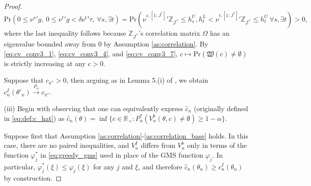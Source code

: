 \documentclass[letterpaper,11pt]{article}
\theoremstyle{myplain}
\theoremstyle{mydefinition}
\theoremstyle{myremark}
\renewcommand{\cite}{\citet}
\newcommand{\HH}{\mathbb{Z}}
\newcommand{\R}{\mathbb{R}}
\numberwithin{equation}{section}
\numberwithin{figure}{section}
\begin{document}
\begin{appendices}
\begin{proof}
\begin{equation}
\textrm{Pr}\left(0\le \nu^{s}{}'g,~0\le \nu^{t}{}'g<\delta\nu^{t}{}'\tau,~\forall s,\exists t\right)
=\textrm{Pr}\left(\nu^{s,[1:J^*]}{}'\HH_{\mathcal J^*}\le h^U_s, h_t^L<\nu^{t,[1:J^*]}{}'\HH_{\mathcal J^*} \le h_t^U~\forall s,\exists t\right)>0,\label{eq:cv_conv3_7}
\end{equation}
where the last inequality follows because $\HH_{\mathcal J^*}$'s correlation matrix $\Omega$ has an eigenvalue bounded away from 0 by Assumption \ref{as:correlation}.
By \eqref{eq:cv_conv3_1}, \eqref{eq:cv_conv3_4}, and \eqref{eq:cv_conv3_7}, $c\mapsto\mathrm{Pr}\left(\mathfrak{W}(c)\neq \emptyset \right)$ is strictly increasing at any $c>0$.

Suppose that $c_{\pi^*}>0$, then arguing as in Lemma 5.(i) of \cite{Andrews:2010aa}, we obtain $c^I_n(\theta'_n)\stackrel{P_n}{\to}c_{\pi^*}$.


(iii) Begin with observing that one can equivalently express $\hat{c}_n$ (originally defined in \eqref{eq:def:c_hat}) as  $\hat{c}_n(\theta)= \inf\{c\in\R_+:P^*_n(V^b_n(\theta,c)\neq \emptyset) \ge 1-\alpha\}$. 

Suppose first that Assumption \ref{as:correlation}-\ref{as:correlation_base} holds. In this case, there are no paired inequalities, and $V^I_n$ differs from $V_n^b$ only in terms of the function $\varphi^*_j$ in \eqref{eq:greedy_gms} used in place of the GMS function $\varphi_j$. In particular, $\varphi^*_j(\xi)\le \varphi_j(\xi)$ for any $j$ and $\xi$, and therefore $\hat c_n(\theta_n)\ge c^{I}_n(\theta_n)$ by construction.


\end{proof}
\end{appendices}
\end{document}
